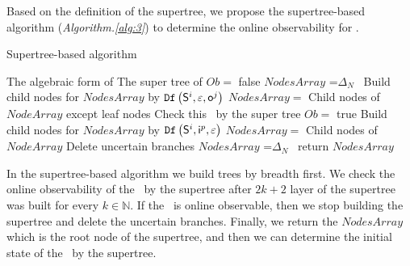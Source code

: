 Based on the definition of the supertree, we propose the supertree-based algorithm ({\em Algorithm.\ref{alg:3}}) to determine the online observability for \BCNs. 
\begin{algorithm}[h]
\caption{Supertree-based algorithm}
\begin{algorithmic}[1]
\REQUIRE 
The algebraic form of \BCN
\ENSURE  
The super tree of \BCN
\STATE  $Ob=$ false %
\STATE  $NodesArray$ =$\Delta_N$\
\STATE Build child nodes for $NodesArray$ by ${\tt Df}\left(\mathsf{S}^i,\varepsilon, \mathsf{o}^j\right)$
\STATE $NodesArray=$ Child nodes of $NodeArray$ except leaf nodes
\STATE Check this \BCN\ by the super tree
\STATE $Ob=$ true
\ELSE
\STATE Build child nodes for $NodesArray$ by ${\tt Df}\left(\mathsf{S}^i,\mathsf{i}^p,\varepsilon\right)$
\STATE $NodesArray=$ Child nodes of $NodeArray$
\ENDIF
\ENDWHILE
\STATE Delete uncertain branches
\STATE  $NodesArray$ =$\Delta_N$\
\STATE return $NodesArray$
\end{algorithmic}
 \label{alg:3}
\end{algorithm}

In the supertree-based algorithm we build trees by breadth first. We check the online observability of the \BCN\ by the supertree after $2k+2$ layer of the supertree was built for every $k\in  \mathbb{N}$. If the \BCN\ is online observable, then we stop building the supertree and delete the uncertain branches. Finally, we return the $NodesArray$ which is the root node of the supertree, and then we can determine the initial state of the \BCN\ by the supertree.

